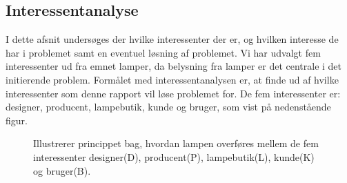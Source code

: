 \subsection{Interessentanalyse}
I dette afsnit undersøges der hvilke interessenter der er, og hvilken interesse de har i problemet samt en eventuel løsning af problemet. Vi har udvalgt fem interessenter ud fra emnet lamper, da belysning fra lamper er det centrale i det initierende problem. Formålet med interessentanalysen er, at finde ud af hvilke interessenter som denne rapport vil løse problemet for. De fem interessenter er: designer, producent, lampebutik, kunde og bruger, som vist på nedenstående figur.

\begin{figure}[H]
	\centering
  \caption{Illustrerer princippet bag, hvordan lampen overføres mellem de fem interessenter designer(D), producent(P), lampebutik(L), kunde(K) og bruger(B).}
  \label{fig:interessenter}
\end{figure}







